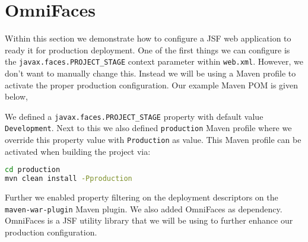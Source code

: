 \section{OmniFaces}
Within this section we demonstrate how to configure a JSF web application to ready it for production deployment.
One of the first things we can configure is the \texttt{javax.\allowbreak faces.PROJECT\_STAGE} context parameter within \texttt{web.xml}.
However, we don't want to manually change this. Instead we will be using a Maven profile to activate the proper production configuration.
Our example Maven POM is given below,

We defined a \texttt{javax.\allowbreak faces.PROJECT\_STAGE} property with default value \texttt{Development}.
Next to this we also defined \texttt{production} Maven profile where we override this property value with \texttt{Production} as value.
This Maven profile can be activated when building the project via:
\begin{lstlisting}[language=bash]
cd production
mvn clean install -Pproduction
\end{lstlisting}
Further we enabled property filtering on the deployment descriptors on the \texttt{maven\allowbreak-war\allowbreak-plugin} Maven plugin.
We also added OmniFaces \cite{omnifaces} as dependency.
OmniFaces is a JSF utility library that we will be using to further enhance our production configuration.

